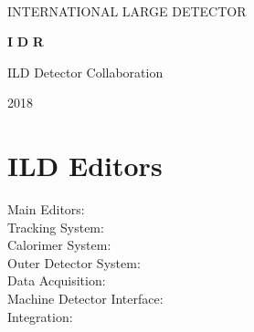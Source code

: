 %
%
\begin{titlepage}
\begin{center}
~
 ~\vskip 4cm

    {\huge  INTERNATIONAL} 
    {\huge  LARGE} 
    {\huge  DETECTOR}
    
  \vskip 1.2cm

    {\huge \bfseries I}
    {\huge \bfseries D}
    {\huge \bfseries R}

  \vskip 1.2cm




{\huge ILD Detector Collaboration} \\
    
  \vskip 0.5cm

{\huge }

  \vskip 3cm

    {\huge 2018}

\end{center}
\end{titlepage}

\newpage\thispagestyle{empty}
\cleardoublepage


\chapter*{ILD Editors}
\noindent Main Editors:\\

\vspace*{2mm}
\noindent Tracking System:\\

\vspace*{2mm}
\noindent Calorimer System:\\


\vspace*{2mm}
\noindent Outer Detector System:\\

\vspace*{2mm}
\noindent Data Acquisition: \\


\vspace*{2mm}
\noindent Machine Detector Interface:\\

\vspace*{2mm}
\noindent Integration:\\

